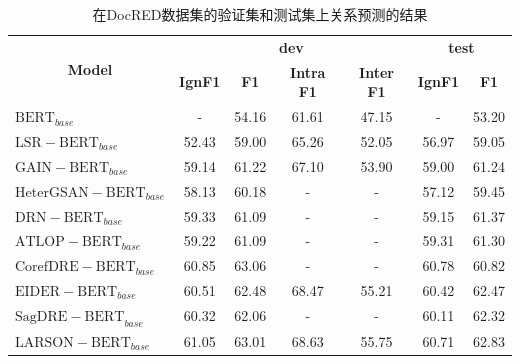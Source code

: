 \documentclass[bachelor]{thesis-uestc}
\begin{document}
\begin{table}
    \caption{在DocRED数据集的验证集和测试集上关系预测的结果}
    \begin{tabular}{@{}llllcccccc@{}}
    \toprule
    \multicolumn{4}{c}{\multirow{2}{*}{\textbf{Model}}} & \multicolumn{4}{c}{\textbf{dev}}             & \multicolumn{2}{c}{\textbf{test}} \\ \cmidrule(l){5-10} 
    \multicolumn{4}{c}{}                       & \textbf{IgnF1} & \textbf{F1}    & \textbf{Intra F1} & \textbf{Inter F1} & \textbf{IgnF1}       & \textbf{F1}         \\ \midrule
    \multicolumn{4}{l}{$\mathrm{BERT}_{base}$\cite{DOCRED}}                   & -     & 54.16 & 61.61    & 47.15    & -           & 53.20      \\
    
    \multicolumn{4}{l}{$\mathrm{LSR-BERT}_{base}$\cite{nan-etal-2020-reasoning}}                   & 52.43 & 59.00 & 65.26   & 52.05   & 56.97       & 59.05   \\
    \multicolumn{4}{l}{$\mathrm{GAIN-BERT}_{base}$\cite{GAIN}}                   & 59.14 & 61.22 & 67.10    & 53.90    & 59.00       & 61.24      \\
    \multicolumn{4}{l}{$\mathrm{HeterGSAN-BERT}_{base}$\cite{Xu2020DocumentLevelRE}}                   & 58.13 & 60.18 & -   & -   & 57.12       & 59.45   \\
    \multicolumn{4}{l}{$\mathrm{DRN-BERT}_{base}$\cite{xu-etal-2021-discriminative}}                   & 59.33 & 61.09 & -   & -   & 59.15       & 61.37   \\
    \multicolumn{4}{l}{$\mathrm{ATLOP-BERT}_{base}$\cite{zhou2021document}}                  & 59.22 & 61.09 & -        & -        & 59.31       & 61.30      \\
    \multicolumn{4}{l}{$\mathrm{CorefDRE-BERT}_{base}$\cite{xue2022corefdre}}                  & 60.85 & 63.06 & -        & -        & 60.78       & 60.82      \\
    \multicolumn{4}{l}{$\mathrm{EIDER-BERT}_{base}$\cite{xie2022eider}}                  & 60.51 & 62.48 & 68.47    & 55.21    & 60.42       & 62.47      \\
    \multicolumn{4}{l}{$\mathrm{SagDRE-BERT}_{base}$\cite{SagDRE}}                 & 60.32 & 62.06 & -        & -        & 60.11       & 62.32      \\
    \multicolumn{4}{l}{$\mathrm{LARSON-BERT}_{base}$\cite{duan-etal-2022-just}}                 & 61.05 & 63.01 & 68.63        & 55.75        & 60.71       & 62.83      \\

\end{tabular}
\end{table}
\end{document}
